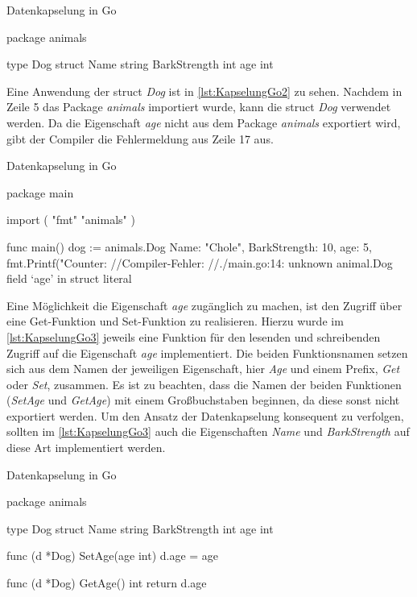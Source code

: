 \begin{listing}[H]
\caption{Datenkapselung in Go \cite[]{Kennedy.GoExport}}
\label{lst:KapselungGo}
\begin{GoCode}
package animals

type Dog struct {
    Name string
    BarkStrength int
    age int
}
\end{GoCode}
\end{listing}

Eine Anwendung der struct \emph{Dog} ist in \autoref{lst:KapselungGo2} zu sehen.
Nachdem in Zeile 5 das Package \emph{animals} importiert wurde, kann die struct \emph{Dog} verwendet werden.
Da die Eigenschaft \emph{age} nicht aus dem Package \emph{animals} exportiert wird, gibt der Compiler die Fehlermeldung aus Zeile 17 aus. 

\begin{listing}[H]
\caption{Datenkapselung in Go \cite[]{Kennedy.GoExport}}
\label{lst:KapselungGo2}
\begin{GoCode}
package main

import (
    "fmt"
    "animals"
)

func main() {
    dog := animals.Dog{
        Name:         "Chole",
        BarkStrength: 10,
        age:          5,
    }
    fmt.Printf("Counter: %
}
//Compiler-Fehler: 
//./main.go:14: unknown animal.Dog field ‘age’ in struct literal
\end{GoCode}
\end{listing}

Eine Möglichkeit die Eigenschaft \emph{age} zugänglich zu machen, ist den Zugriff über eine Get-Funktion und Set-Funktion zu realisieren.
Hierzu wurde im \autoref{lst:KapselungGo3} jeweils eine Funktion für den lesenden und schreibenden Zugriff auf die Eigenschaft \emph{age} implementiert. 
Die beiden Funktionsnamen setzen sich aus dem Namen der jeweiligen Eigenschaft, hier \emph{Age} und einem Prefix, \emph{Get} oder \emph{Set}, zusammen.
Es ist zu beachten, dass die Namen der beiden Funktionen (\emph{SetAge} und \emph{GetAge}) mit einem Großbuchstaben beginnen, da diese sonst nicht exportiert werden. 
Um den Ansatz der Datenkapselung konsequent zu verfolgen, sollten im \autoref{lst:KapselungGo3} auch die Eigenschaften \emph{Name} und \emph{BarkStrength} auf diese Art implementiert werden.   

\begin{listing}[H]
\caption{Datenkapselung in Go}
\label{lst:KapselungGo3}
\begin{GoCode}
package animals

type Dog struct {
    Name string
    BarkStrength int
    age int
}

func (d *Dog) SetAge(age int) {
    d.age = age
}

func (d *Dog) GetAge() int {
    return d.age
}
\end{GoCode}
\end{listing}


